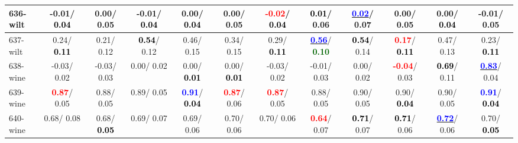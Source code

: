 \begin{table}[h]
\begin{center}
{\begin{tabular}{lc|c|c|c|c|c|c|c|c|c|c}
636-wilt &  -0.01/\textcolor{black}{\textbf{  0.04}} &   0.00/  0.05 &  -0.01/\textcolor{black}{\textbf{  0.04}} &   0.00/\textcolor{black}{\textbf{  0.04}} &   0.00/  0.05 & \textcolor{red}{\textbf{ -0.02}}/\textcolor{black}{\textbf{  0.04}} & \textcolor{black}{\textbf{  0.01}}/  0.06 & \underline{\textcolor{blue}{\textbf{  0.02}}}/  0.07 &   0.00/  0.05 &   0.00/\textcolor{black}{\textbf{  0.04}} &  -0.01/  0.05 \\ \hline
637-wilt &   0.24/\textcolor{black}{\textbf{  0.11}} &   0.21/  0.12 & \textcolor{black}{\textbf{  0.54}}/  0.12 &   0.46/  0.15 &   0.34/  0.15 &   0.29/\textcolor{black}{\textbf{  0.11}} & \underline{\textcolor{blue}{\textbf{  0.56}}}/\textcolor{darkgreen}{\textbf{  0.10}} & \textcolor{black}{\textbf{  0.54}}/  0.14 & \textcolor{red}{\textbf{  0.17}}/\textcolor{black}{\textbf{  0.11}} &   0.47/  0.13 &   0.23/\textcolor{black}{\textbf{  0.11}} \\
638-wine &  -0.03/  0.02 &  -0.03/  0.03 &   0.00/  0.02 &   0.00/\textcolor{black}{\textbf{  0.01}} &   0.00/\textcolor{black}{\textbf{  0.01}} &  -0.03/  0.02 &  -0.01/  0.03 &   0.00/  0.02 & \textcolor{red}{\textbf{ -0.04}}/  0.03 & \textcolor{black}{\textbf{  0.69}}/  0.11 & \underline{\textcolor{blue}{\textbf{  0.83}}}/  0.04 \\
639-wine & \textcolor{red}{\textbf{  0.87}}/  0.05 &   0.88/  0.05 &   0.89/  0.05 & \textcolor{blue}{\textbf{  0.91}}/\textcolor{black}{\textbf{  0.04}} & \textcolor{red}{\textbf{  0.87}}/  0.06 & \textcolor{red}{\textbf{  0.87}}/  0.05 &   0.88/  0.05 &   0.90/  0.05 &   0.90/\textcolor{black}{\textbf{  0.04}} &   0.90/  0.05 & \textcolor{blue}{\textbf{  0.91}}/\textcolor{black}{\textbf{  0.04}} \\
640-wine &   0.68/  0.08 &   0.68/\textcolor{black}{\textbf{  0.05}} &   0.69/  0.07 &   0.69/  0.06 &   0.70/  0.06 &   0.70/  0.06 & \textcolor{red}{\textbf{  0.64}}/  0.07 & \textcolor{black}{\textbf{  0.71}}/  0.07 & \textcolor{black}{\textbf{  0.71}}/  0.06 & \underline{\textcolor{blue}{\textbf{  0.72}}}/  0.06 &   0.70/\textcolor{black}{\textbf{  0.05}} \\\end{tabular}}\label{stratsALCKappa19AllReduxHalfa}
\end{center}
\end{table}
